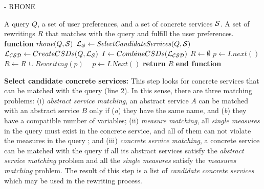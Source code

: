 \begin{algorithm}
\small
\caption{ - RHONE}
\label{algo-rhone}
\begin{algorithmic}[1]
\REQUIRE A query $Q$, a set of user preferences, and a set of concrete services $\hbox{${\cal S}$}$.
\ENSURE A set of rewritings $R$ that matches with the query and fulfill the user preferences.
\STATE \textbf{function} $\mathit{rhone} (Q, \hbox{${\cal S}$})$
 \STATE  $\hbox{${\cal L_{S}}$} \leftarrow \mathit{SelectCandidateServices}(Q, \hbox{${\cal S}$})$ \label{rhone:buildPCD}
 \STATE  $\hbox{${\cal L_{CSD}}$} \leftarrow CreateCSDs(Q, \hbox{${\cal L_{S}}$})$
 \STATE  $I \leftarrow CombineCSDs(\hbox{${\cal L_{CSD}}$})$
 \STATE $R\leftarrow \emptyset$
    \STATE $p \leftarrow I.next()$
  \STATE $R\leftarrow R\,\cup \mathit{Rewriting}(p)$
  \STATE ~\!
   \ENDIF
      \STATE $p \leftarrow I.\mathit{Next}()$
 \ENDWHILE
    \STATE \textbf{return} $R$
\STATE \textbf{end function}
\end{algorithmic}
\end{algorithm}

\noindent \textbf{Select candidate concrete services:} This step
 looks for concrete services that can be matched with the query (line 2). In
 this sense, there are three matching problems: 
 (i) \textit{abstract service matching}, an abstract service $A$ can be
 matched with an abstract service $B$ only if (\textit{a}) they have the same
 name, and (\textit{b}) they have a compatible number of variables;
 (ii) \textit{measure matching}, all \textit{single measures} in the query must
 exist in the concrete service, and all of them can not violate the measures in
 the query ; and 
 (iii) \textit{concrete service matching}, a concrete service can
 be matched with the query if all its abstract services satisfy the \textit{abstract service
 matching} problem and all the \textit{single measures} satisfy the \textit{measures matching} problem.
The result of this step is a list of \textit{candidate concrete services} which
may be used in the rewriting process.


